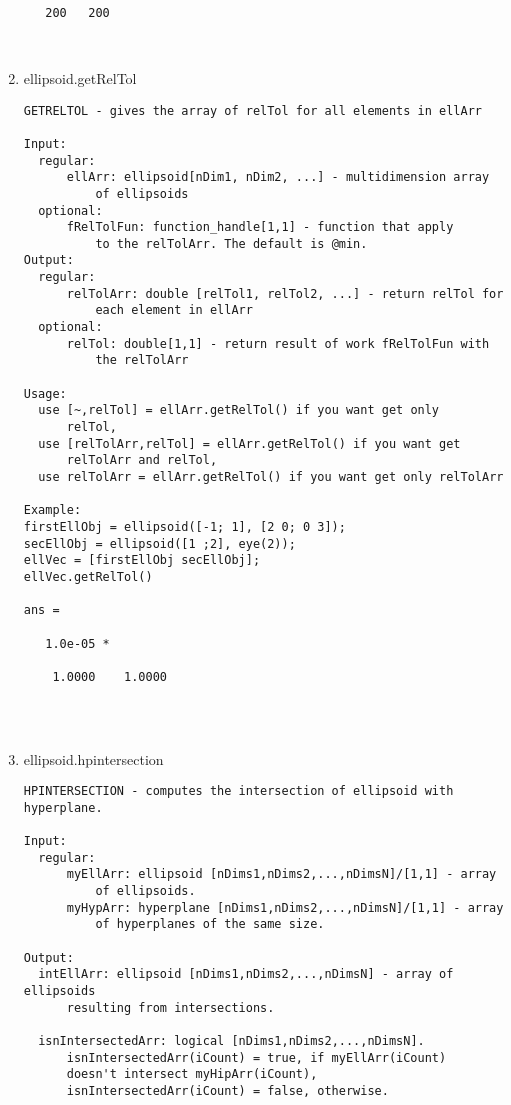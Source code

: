 \begin{enumerate}
\begin{lstlisting}
   200   200



\end{lstlisting}
\fontfamily{\familydefault}
\selectfont
\item {ellipsoid.getRelTol}
\selectfont
\begin{lstlisting}
GETRELTOL - gives the array of relTol for all elements in ellArr

Input:
  regular:
      ellArr: ellipsoid[nDim1, nDim2, ...] - multidimension array
          of ellipsoids
  optional:
      fRelTolFun: function_handle[1,1] - function that apply
          to the relTolArr. The default is @min.
Output:
  regular:
      relTolArr: double [relTol1, relTol2, ...] - return relTol for
          each element in ellArr
  optional:
      relTol: double[1,1] - return result of work fRelTolFun with
          the relTolArr

Usage:
  use [~,relTol] = ellArr.getRelTol() if you want get only
      relTol,
  use [relTolArr,relTol] = ellArr.getRelTol() if you want get
      relTolArr and relTol,
  use relTolArr = ellArr.getRelTol() if you want get only relTolArr

Example:
firstEllObj = ellipsoid([-1; 1], [2 0; 0 3]);
secEllObj = ellipsoid([1 ;2], eye(2));
ellVec = [firstEllObj secEllObj];
ellVec.getRelTol()

ans =

   1.0e-05 *

    1.0000    1.0000




\end{lstlisting}
\fontfamily{\familydefault}
\selectfont
\item {ellipsoid.hpintersection}
\selectfont
\begin{lstlisting}
HPINTERSECTION - computes the intersection of ellipsoid with hyperplane.

Input:
  regular:
      myEllArr: ellipsoid [nDims1,nDims2,...,nDimsN]/[1,1] - array
          of ellipsoids.
      myHypArr: hyperplane [nDims1,nDims2,...,nDimsN]/[1,1] - array
          of hyperplanes of the same size.

Output:
  intEllArr: ellipsoid [nDims1,nDims2,...,nDimsN] - array of ellipsoids
      resulting from intersections.

  isnIntersectedArr: logical [nDims1,nDims2,...,nDimsN].
      isnIntersectedArr(iCount) = true, if myEllArr(iCount)
      doesn't intersect myHipArr(iCount),
      isnIntersectedArr(iCount) = false, otherwise.


\end{lstlisting}
\end{enumerate}
